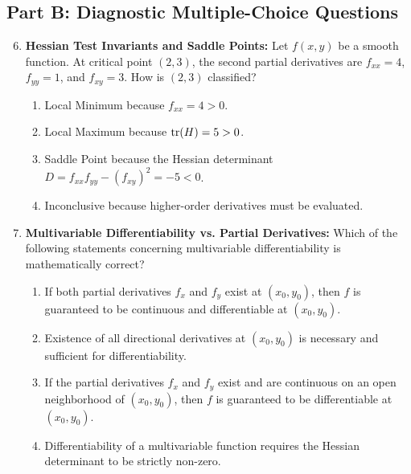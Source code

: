 \subsection*{Part B: Diagnostic Multiple-Choice Questions}
\begin{enumerate}
\setcounter{enumi}{5}
\item \textbf{Hessian Test Invariants and Saddle Points:} Let $f(x, y)$ be a smooth function. At critical point $(2, 3)$, the second partial derivatives are $f_{xx} = 4$, $f_{yy} = 1$, and $f_{xy} = 3$. How is $(2, 3)$ classified?
\begin{enumerate}
    \item Local Minimum because $f_{xx} = 4 > 0$.
    \item Local Maximum because $\operatorname{tr}(H) = 5 > 0$.
    \item Saddle Point because the Hessian determinant $D = f_{xx} f_{yy} - (f_{xy})^2 = -5 < 0$.
    \item Inconclusive because higher-order derivatives must be evaluated.
\end{enumerate}

\item \textbf{Multivariable Differentiability vs. Partial Derivatives:} Which of the following statements concerning multivariable differentiability is mathematically correct?
\begin{enumerate}
    \item If both partial derivatives $f_x$ and $f_y$ exist at $(x_0, y_0)$, then $f$ is guaranteed to be continuous and differentiable at $(x_0, y_0)$.
    \item Existence of all directional derivatives at $(x_0, y_0)$ is necessary and sufficient for differentiability.
    \item If the partial derivatives $f_x$ and $f_y$ exist and are continuous on an open neighborhood of $(x_0, y_0)$, then $f$ is guaranteed to be differentiable at $(x_0, y_0)$.
    \item Differentiability of a multivariable function requires the Hessian determinant to be strictly non-zero.
\end{enumerate}
\end{enumerate}
